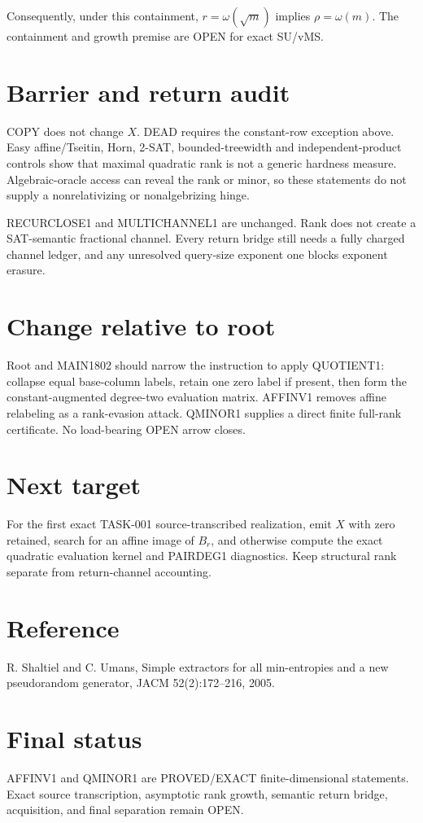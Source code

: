 \documentclass{article}
\begin{document}
Consequently, under this containment, \(r=\omega(\sqrt m)\) implies \(\rho=\omega(m)\). The containment and growth premise are OPEN for exact SU/vMS.

\section*{Barrier and return audit}
COPY does not change \(X\). DEAD requires the constant-row exception above. Easy affine/Tseitin, Horn, 2-SAT, bounded-treewidth and independent-product controls show that maximal quadratic rank is not a generic hardness measure. Algebraic-oracle access can reveal the rank or minor, so these statements do not supply a nonrelativizing or nonalgebrizing hinge.

RECURCLOSE1 and MULTICHANNEL1 are unchanged. Rank does not create a SAT-semantic fractional channel. Every return bridge still needs a fully charged channel ledger, and any unresolved query-size exponent one blocks exponent erasure.

\section*{Change relative to root}
Root and MAIN1802 should narrow the instruction to apply QUOTIENT1: collapse equal base-column labels, retain one zero label if present, then form the constant-augmented degree-two evaluation matrix. AFFINV1 removes affine relabeling as a rank-evasion attack. QMINOR1 supplies a direct finite full-rank certificate. No load-bearing OPEN arrow closes.

\section*{Next target}
For the first exact TASK-001 source-transcribed realization, emit \(X\) with zero retained, search for an affine image of \(B_r\), and otherwise compute the exact quadratic evaluation kernel and PAIRDEG1 diagnostics. Keep structural rank separate from return-channel accounting.

\section*{Reference}
R. Shaltiel and C. Umans, Simple extractors for all min-entropies and a new pseudorandom generator, JACM 52(2):172--216, 2005.

\section*{Final status}
AFFINV1 and QMINOR1 are PROVED/EXACT finite-dimensional statements. Exact source transcription, asymptotic rank growth, semantic return bridge, acquisition, and final separation remain OPEN.
\end{document}
